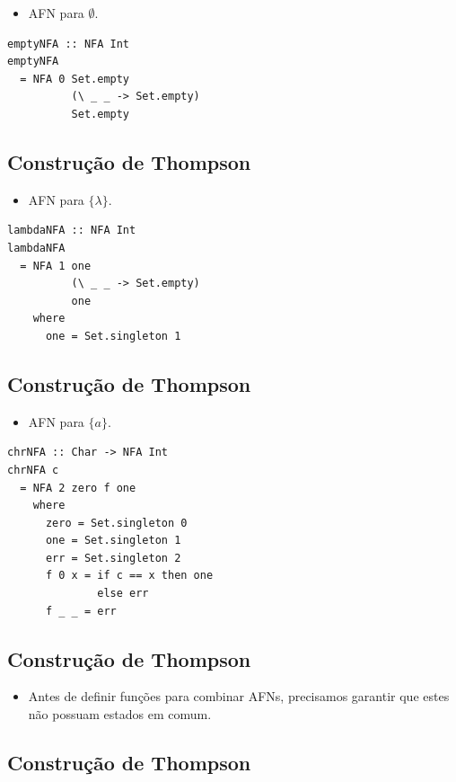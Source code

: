 \documentclass[11pt]{article}
\begin{document}
\begin{itemize}
\item AFN para \(\emptyset\).
\end{itemize}

\begin{verbatim}
emptyNFA :: NFA Int
emptyNFA
  = NFA 0 Set.empty
          (\ _ _ -> Set.empty)
          Set.empty
\end{verbatim}
\subsection*{Construção de Thompson}
\label{sec:org261e17e}

\begin{itemize}
\item AFN para \(\{\lambda\}\).
\end{itemize}

\begin{verbatim}
lambdaNFA :: NFA Int
lambdaNFA
  = NFA 1 one
          (\ _ _ -> Set.empty)
          one
    where
      one = Set.singleton 1
\end{verbatim}
\subsection*{Construção de Thompson}
\label{sec:org19f06e9}

\begin{itemize}
\item AFN para \(\{a\}\).
\end{itemize}

\begin{verbatim}
chrNFA :: Char -> NFA Int
chrNFA c
  = NFA 2 zero f one
    where
      zero = Set.singleton 0
      one = Set.singleton 1
      err = Set.singleton 2
      f 0 x = if c == x then one
              else err
      f _ _ = err
\end{verbatim}
\subsection*{Construção de Thompson}
\label{sec:org0a27247}

\begin{itemize}
\item Antes de definir funções para combinar AFNs,
precisamos garantir que estes não possuam estados em comum.
\end{itemize}
\subsection*{Construção de Thompson}
\label{sec:org93450d5}
\end{document}
